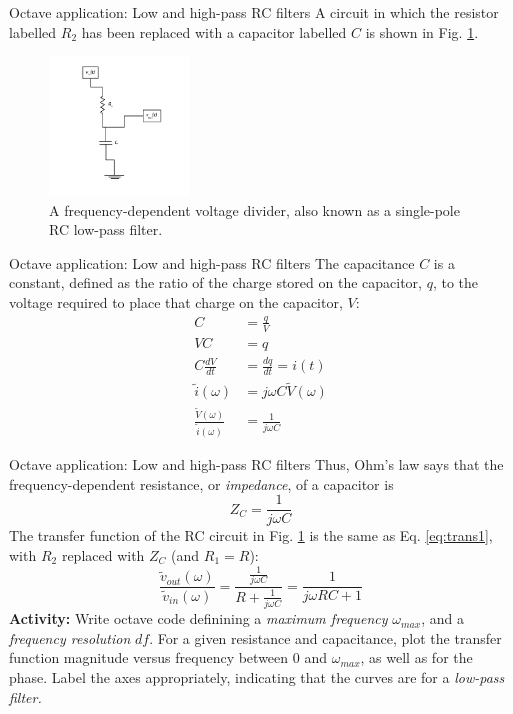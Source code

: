 \documentclass{beamer}
\begin{document}
\begin{frame}{Octave application: Low and high-pass RC filters}
\small
A circuit in which the resistor labelled $R_2$ has been replaced with a capacitor labelled $C$ is shown in Fig. \ref{fig:fig2}.
\begin{figure}
\centering
\includegraphics[width=0.33\textwidth,trim=0cm 1cm 0cm 0cm,clip=true]{figures/LowPass.pdf}
\caption{\label{fig:fig2} A frequency-dependent voltage divider, also known as a single-pole RC low-pass filter.}
\end{figure}
\end{frame}

\begin{frame}{Octave application: Low and high-pass RC filters}
\small
The capacitance $C$ is a constant, defined as the ratio of the charge stored on the capacitor, $q$, to the voltage required to place that charge on the capacitor, $V$:
\begin{align}
C &= \frac{q}{V} \\
VC &= q \\
C \frac{dV}{dt} &= \frac{dq}{dt} = i(t) \\
\tilde{i}(\omega) &= j\omega C \tilde{V}(\omega) \\
\frac{\tilde{V}(\omega)}{\tilde{i}(\omega)} &= \frac{1}{j\omega C}
\end{align}
\end{frame}

\begin{frame}{Octave application: Low and high-pass RC filters}
\small
Thus, Ohm's law says that the frequency-dependent resistance, or \textit{impedance}, of a capacitor is
\begin{equation}
\boxed{
Z_C = \frac{1}{j\omega C}
}
\label{eq:eq5}
\end{equation}
The transfer function of the RC circuit in Fig. \ref{fig:fig2} is the same as Eq. \ref{eq:trans1}, with $R_2$ replaced with $Z_C$ (and $R_1 = R$):
\begin{equation}
\frac{\tilde{v}_{out}(\omega)}{\tilde{v}_{in}(\omega)} = \frac{\frac{1}{j\omega C}}{R+\frac{1}{j\omega C}} = \frac{1}{j\omega R C + 1}
\label{eq:trans2}
\end{equation}
\textbf{Activity:} Write octave code definining a \textit{maximum frequency} $\omega_{max}$, and a \textit{frequency resolution} $df$. For a given resistance and capacitance, plot the transfer function magnitude versus frequency between $0$ and $\omega_{max}$, as well as for the phase. Label the axes appropriately, indicating that the curves are for a \textit{low-pass filter.}
\end{frame}
\end{document}
